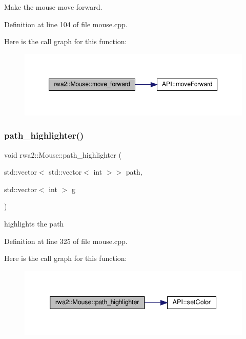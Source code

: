 Make the mouse move forward. 



Definition at line 104 of file mouse.\+cpp.

Here is the call graph for this function\+:
\nopagebreak
\begin{figure}[H]
\begin{center}
\leavevmode
\includegraphics[width=350pt]{classrwa2_1_1_mouse_afc6e0d56e3a777c05efa3929eb256e0a_cgraph}
\end{center}
\end{figure}
\mbox{\label{classrwa2_1_1_mouse_a42834070b0bc9cee1993b745b85c2e29}} 
\subsubsection{\texorpdfstring{path\+\_\+highlighter()}{path\_highlighter()}}
{\footnotesize\ttfamily void rwa2\+::\+Mouse\+::path\+\_\+highlighter (\begin{DoxyParamCaption}\item[{std\+::vector$<$ std\+::vector$<$ int $>$$>$}]{path,  }\item[{std\+::vector$<$ int $>$}]{g }\end{DoxyParamCaption})}



highlights the path 



Definition at line 325 of file mouse.\+cpp.

Here is the call graph for this function\+:
\nopagebreak
\begin{figure}[H]
\begin{center}
\leavevmode
\includegraphics[width=339pt]{classrwa2_1_1_mouse_a42834070b0bc9cee1993b745b85c2e29_cgraph}
\end{center}
\end{figure}
\mbox{\label{classrwa2_1_1_mouse_a4b441e30f6c9d446b901f9b21ba104df}} 
